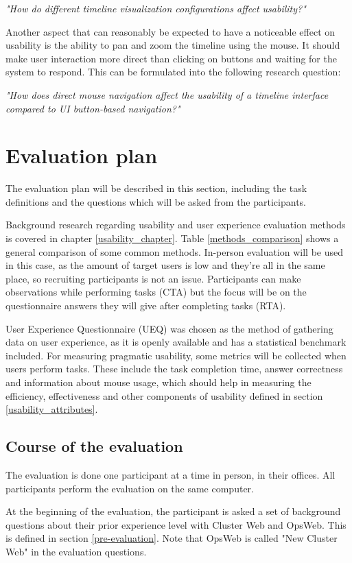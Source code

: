 \textit{"How do different timeline visualization configurations affect usability?"}

Another aspect that can reasonably be expected to have a noticeable effect on usability is the ability to pan and zoom the timeline using the mouse. It should make user interaction more direct than clicking on buttons and waiting for the system to respond. This can be formulated into the following research question:

\textit{"How does direct mouse navigation affect the usability of a timeline interface compared to UI button-based navigation?"}

\section{Evaluation plan} \label{evaluation_plan}
The evaluation plan will be described in this section, including the task definitions and the questions which will be asked from the participants.

Background research regarding usability and user experience evaluation methods is covered in chapter \ref{usability_chapter}. Table \ref{methods_comparison} shows a general comparison of some common methods. In-person evaluation will be used in this case, as the amount of target users is low and they're all in the same place, so recruiting participants is not an issue. Participants can make observations while performing tasks (CTA) but the focus will be on the questionnaire answers they will give after completing tasks (RTA).

User Experience Questionnaire (UEQ) \cite{laugwitz2008construction} was chosen as the method of gathering data on user experience, as it is openly available and has a statistical benchmark included. For measuring pragmatic usability, some metrics will be collected when users perform tasks. These include the task completion time, answer correctness and information about mouse usage, which should help in measuring the efficiency, effectiveness and other components of usability defined in section \ref{usability_attributes}.

\subsection{Course of the evaluation}
The evaluation is done one participant at a time in person, in their offices. All participants perform the evaluation on the same computer.

At the beginning of the evaluation, the participant is asked a set of background questions about their prior experience level with Cluster Web and OpsWeb. This is defined in section \ref{pre-evaluation}. Note that OpsWeb is called "New Cluster Web" in the evaluation questions.

